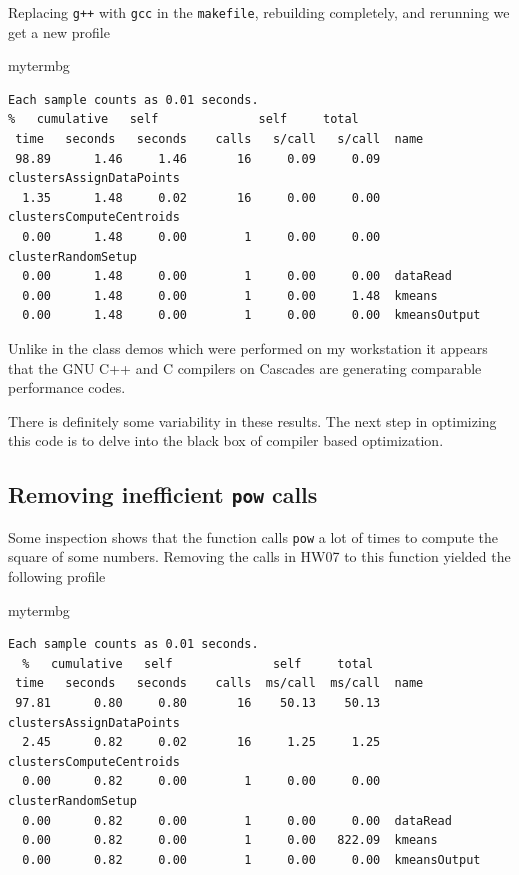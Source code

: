 Replacing \texttt{g++} with \texttt{gcc} in the \texttt{makefile}, rebuilding completely, and rerunning we get a new profile

\begin{tsession}{mytermbg}
\begin{Verbatim}
Each sample counts as 0.01 seconds.
%   cumulative   self              self     total           
 time   seconds   seconds    calls   s/call   s/call  name 
 98.89      1.46     1.46       16     0.09     0.09  clustersAssignDataPoints
  1.35      1.48     0.02       16     0.00     0.00  clustersComputeCentroids
  0.00      1.48     0.00        1     0.00     0.00  clusterRandomSetup
  0.00      1.48     0.00        1     0.00     0.00  dataRead
  0.00      1.48     0.00        1     0.00     1.48  kmeans
  0.00      1.48     0.00        1     0.00     0.00  kmeansOutput
\end{Verbatim}
\end{tsession} 

Unlike in the class demos which were performed on my workstation it appears that the GNU C++ and C compilers on Cascades are generating comparable performance codes.

There is definitely some variability in these results. The next step in optimizing this code is to delve into the black box of compiler based optimization.

\subsection{Removing inefficient \texttt{pow} calls}

Some inspection shows that the function calls \texttt{pow} a lot of times to compute the square of some numbers. Removing the calls in HW07 to this function yielded the following profile

\begin{tsession}{mytermbg}
\begin{Verbatim}
Each sample counts as 0.01 seconds.
  %   cumulative   self              self     total           
 time   seconds   seconds    calls  ms/call  ms/call  name    
 97.81      0.80     0.80       16    50.13    50.13  clustersAssignDataPoints
  2.45      0.82     0.02       16     1.25     1.25  clustersComputeCentroids
  0.00      0.82     0.00        1     0.00     0.00  clusterRandomSetup
  0.00      0.82     0.00        1     0.00     0.00  dataRead
  0.00      0.82     0.00        1     0.00   822.09  kmeans
  0.00      0.82     0.00        1     0.00     0.00  kmeansOutput
\end{Verbatim}
\end{tsession} 

